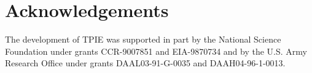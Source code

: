 \chapter*{Acknowledgements}

The development of TPIE was supported in part by the National Science
Foundation under grants CCR-9007851 and EIA-9870734 and by the U.S. Army
Research Office under grants DAAL03-91-G-0035 and DAAH04-96-1-0013.



